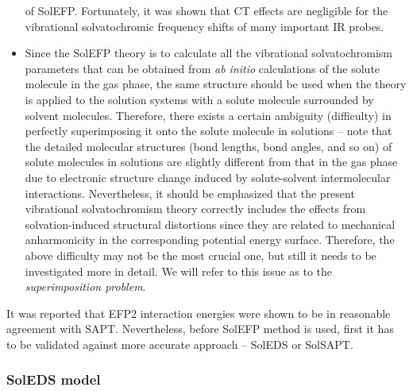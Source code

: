 \documentclass[a4paper,titlepage,twoside,fleqn,12pt]{book}
\begin{document}
\begin{refsection}
\begin{itemize}
of SolEFP. Fortunately,
it was shown that CT effects are negligible for the vibrational solvatochromic frequency shifts 
of many important IR probes.\citep{Lee.Choi.Cho.PCCP.2010,Blasiak.Cho.JCP.2014}
 \item Since the SolEFP theory is to calculate all the vibrational solvatochromism parameters 
that can be obtained from \emph{ab initio} calculations of the solute molecule in the gas phase, 
the same structure should be used when the theory is applied to the solution systems 
with a solute molecule surrounded by solvent molecules. Therefore, there exists a certain 
ambiguity (difficulty) in perfectly superimposing it onto the solute molecule in solutions 
-- note that the detailed molecular structures (bond lengths, bond angles, and so on) 
of solute molecules in solutions are slightly different from that in the gas phase 
due to electronic structure change induced by solute\hyp{}solvent intermolecular interactions. 
Nevertheless, it should be emphasized that the present vibrational solvatochromism theory 
correctly includes the effects from solvation\hyp{}induced structural distortions 
since they are related to mechanical anharmonicity in the corresponding potential 
energy surface. Therefore, the above difficulty may not be the most crucial one, 
but still it needs to be investigated more in detail. We will refer to this issue as to
the \emph{superimposition problem}.
\end{itemize}
%
It was reported that EFP2 interaction energies were shown to be
in reasonable agreement 
with SAPT.\citep{Flick.Kosenkov.Hohenstein.Sherrill.Slipchenko.JCTC.2012} 
Nevertheless, before SolEFP method is used, first it has to be validated
against more accurate approach -- SolEDS or SolSAPT. 

\subsubsection{SolEDS model}


\end{refsection}
\end{document}
